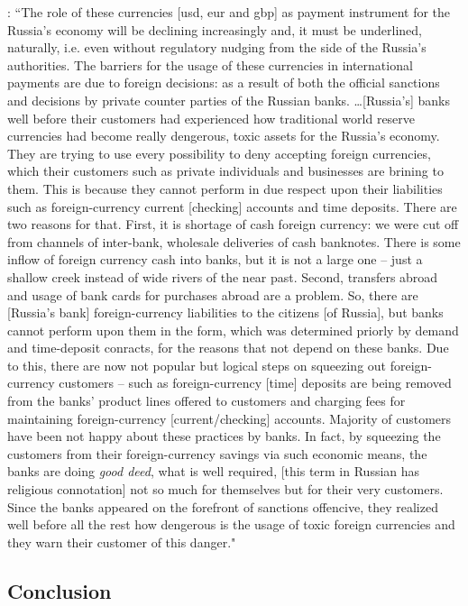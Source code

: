\citep[emphasis added]{tulin2022}: ``The role of these currencies [\ac{usd}, \ac{eur} and \ac{gbp}] as payment instrument for the Russia's economy will be declining increasingly and, it must be underlined, naturally, i.e. even without regulatory nudging from the side of the Russia's authorities. The barriers for the usage of these currencies in international payments are due to foreign decisions: as a result of both the official sanctions and decisions by private counter parties of the Russian banks. \dots [Russia's] banks well before their customers had experienced how traditional world reserve currencies had become really dengerous, toxic assets for the Russia's economy. They are trying to use every possibility to deny accepting foreign currencies, which their customers such as private individuals and businesses are brining to them. This is because they cannot perform in due respect upon their liabilities such as foreign-currency current [checking] accounts and time deposits. There are two reasons for that. First, it is shortage of cash foreign currency: we were cut off from channels of inter-bank, wholesale deliveries of cash banknotes. There is some inflow of foreign currency cash into banks, but it is not a large one -- just a shallow creek instead of wide rivers of the near past. Second, transfers abroad and usage of bank cards for purchases abroad are a problem. So, there are [Russia's bank] foreign-currency liabilities to the citizens [of Russia], but banks cannot perform upon them in the form, which was determined priorly by demand and time-deposit conracts, for the reasons that not depend on these banks. Due to this, there are now not popular but logical steps on squeezing out foreign-currency customers -- such as foreign-currency [time] deposits are being removed from the banks' product lines offered to customers and charging fees for maintaining foreign-currency [current/checking] accounts. Majority of customers have been not happy about these practices by banks. In fact, by squeezing the customers from their foreign-currency savings via such economic means, the banks are doing \textit{good deed}, what is well required, [this term in Russian has religious connotation] not so much for themselves but for their very customers. Since the banks appeared on the forefront of sanctions offencive, they realized well before all the rest how dengerous is the usage of toxic foreign currencies and they warn their customer of this danger."

\subsection{Conclusion}

